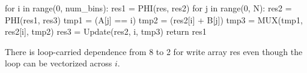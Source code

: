 {\small
\begin{pythonn}
for i in range(0, num_bins):
  res1 = PHI(res, res2)
  for j in range(0, N):
    res2 = PHI(res1, res3)
    tmp1 = (A[j] == i)
    tmp2 = (res2[i] + B[j])
    tmp3 = MUX(tmp1, res2[i], tmp2)
    res3 = Update(res2, i, tmp3)
return res1
\end{pythonn}
}

There is loop-carried dependence from 8 to 2 for write array {\sf res} even though the loop can be vectorized across $i$.

\begin{comment}
Consider the classical example from~\cite{Aiken:1988}: 


{\small
\begin{pythonn}
for i in range(N):
  A[i] = B[i] + 10;
  B[i] = A[i] * D[i-1];
  C[i] = A[i] * D[i-1];
  D[i] = B[i] * C[i];
\end{pythonn}
}

In Cytron's SSA this code (roughly) translates into

{\small
\begin{pythonn}
for i in range(N):
  A_1 = PHI(A_0,A_2)
  B_1 = PHI(B_0,B_2)
  C_1 = PHI(C_0,C_2)
  D_1 = PHI(D_0,D_2)
  A_2 = update(A_1, i, B_1[i] + 10);
  B_2 = update(B_1, i, A_2[i] * D_1[i-1]);
  C_2 = update(C_1, i, A_2[i] * D_1[i-1]);
  D_2 = update(D_1, i, B_2[i] * C_2[i]);
\end{pythonn}
}

There is a cycle around {\sf B\_1 = PHI(B\_0,B\_2)} that includes statement
{\sf A\_1 = update(A\_0, i, B\_1[i] + 10)} and that statement won't be vectorized even
though in fact there is no loop-carried dependency from the write of {\sf B\_1[i]} at 7 to the
read of {\sf ... = B\_1[i]} at 6.
\end{comment}

